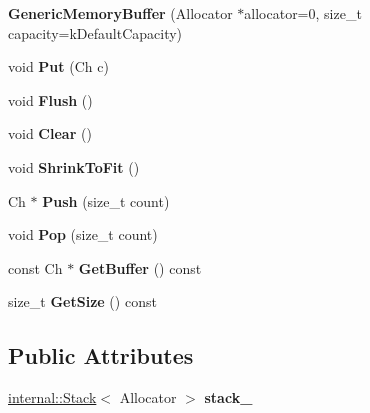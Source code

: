 \begin{DoxyCompactItemize}
\item 
{\bfseries Generic\+Memory\+Buffer} (Allocator $\ast$allocator=0, size\+\_\+t capacity=k\+Default\+Capacity)\hypertarget{struct_generic_memory_buffer_ad08f7da47bca43fcdb0c3b10e22dfa1d}{}\label{struct_generic_memory_buffer_ad08f7da47bca43fcdb0c3b10e22dfa1d}

\item 
void {\bfseries Put} (Ch c)\hypertarget{struct_generic_memory_buffer_a9dfb477983e211893601f8ab637b42d8}{}\label{struct_generic_memory_buffer_a9dfb477983e211893601f8ab637b42d8}

\item 
void {\bfseries Flush} ()\hypertarget{struct_generic_memory_buffer_a9861181cab6f5bec2ec08b601aa53575}{}\label{struct_generic_memory_buffer_a9861181cab6f5bec2ec08b601aa53575}

\item 
void {\bfseries Clear} ()\hypertarget{struct_generic_memory_buffer_a036cbe2556778e1edc525602a9821df2}{}\label{struct_generic_memory_buffer_a036cbe2556778e1edc525602a9821df2}

\item 
void {\bfseries Shrink\+To\+Fit} ()\hypertarget{struct_generic_memory_buffer_a3b87deb9bf34c394c8fb262ab53c0c4b}{}\label{struct_generic_memory_buffer_a3b87deb9bf34c394c8fb262ab53c0c4b}

\item 
Ch $\ast$ {\bfseries Push} (size\+\_\+t count)\hypertarget{struct_generic_memory_buffer_a56f7b14d2940b682fe592f598d6792ec}{}\label{struct_generic_memory_buffer_a56f7b14d2940b682fe592f598d6792ec}

\item 
void {\bfseries Pop} (size\+\_\+t count)\hypertarget{struct_generic_memory_buffer_a82a6706286f1356e1769282f5d496005}{}\label{struct_generic_memory_buffer_a82a6706286f1356e1769282f5d496005}

\item 
const Ch $\ast$ {\bfseries Get\+Buffer} () const \hypertarget{struct_generic_memory_buffer_a9afc78eef159fcbc10d0cea84ccfb26d}{}\label{struct_generic_memory_buffer_a9afc78eef159fcbc10d0cea84ccfb26d}

\item 
size\+\_\+t {\bfseries Get\+Size} () const \hypertarget{struct_generic_memory_buffer_adc22f10318fa6dbdf7eb1fa9041bb68d}{}\label{struct_generic_memory_buffer_adc22f10318fa6dbdf7eb1fa9041bb68d}

\end{DoxyCompactItemize}
\subsection*{Public Attributes}
\begin{DoxyCompactItemize}
\item 
\hyperlink{classinternal_1_1_stack}{internal\+::\+Stack}$<$ Allocator $>$ {\bfseries stack\+\_\+}\hypertarget{struct_generic_memory_buffer_a995607fda24cd06214b9f1bce68f36ab}{}\label{struct_generic_memory_buffer_a995607fda24cd06214b9f1bce68f36ab}

\end{DoxyCompactItemize}

